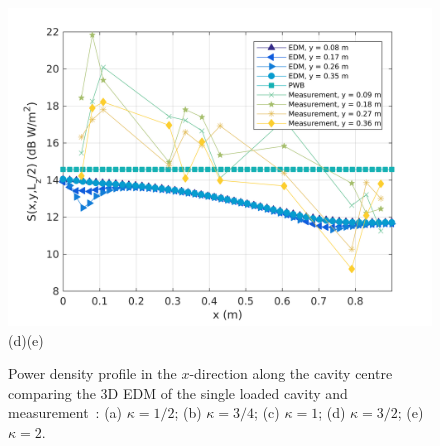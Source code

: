 \documentclass[a4paper]{article}
\numberwithin{equation}{section}
\begin{document}
\begin{figure}[hp]
\begin{center}
\includegraphics[width=0.49\linewidth]{figures/SDM_3D_SL_PowerDensityProfileXMeas_JX_k2_0}\\
{\footnotesize (d)\hspace{75mm}(e)}\\
\vspace{-2mm}
\caption{\label{fg:measprofsslk} Power density profile in the $x$-direction along the cavity centre comparing
the 3D EDM of the single loaded cavity and measurement~\citep{Flintoft2017b}: (a) $\kappa=1/2$; (b) $\kappa=3/4$;
(c) $\kappa=1$; (d) $\kappa=3/2$; (e) $\kappa=2$.}
\end{center}
\end{figure}
\end{document}
